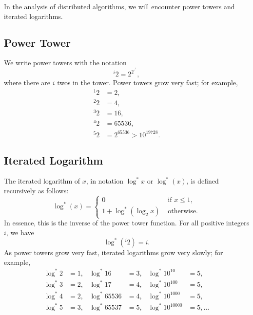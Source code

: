 \label{sec:intro-app}

In the analysis of distributed algorithms, we will encounter power towers and iterated logarithms.

\subsection{Power Tower}

We write power towers with the notation
\[
    {}^i 2 = 2^{2^{\cdot^{\cdot^2}}},
\]
where there are $i$ twos in the tower. Power towers grow very fast; for example,
\begin{align*}
    {}^1 2 &= 2,\\
    {}^2 2 &= 4,\\
    {}^3 2 &= 16,\\
    {}^4 2 &= 65536,\\
    {}^5 2 &= 2^{65536} > 10^{19728}.
\end{align*}

\subsection{Iterated Logarithm}

The iterated logarithm of $x$, in notation $\log^* x$ or $\log^*(x)$, is defined recursively as follows:
\[
    \log^*(x) = \begin{cases}
        0 & \text{ if $x \le 1$}, \\
        1 + \log^*(\log_2 x) & \text{ otherwise}.
    \end{cases}
\]
In essence, this is the inverse of the power tower function. For all positive integers $i$, we have
\[
    \log^*({}^i 2) = i.
\]
As power towers grow very fast, iterated logarithms grow very slowly; for example,
\begin{align*}
    \log^* 2 &= 1, &
    \log^* 16 &= 3, &
    \log^* 10^{10} &= 5, \\
    \log^* 3 &= 2, &
    \log^* 17 &= 4, &
    \log^* 10^{100} &= 5, \\
    \log^* 4 &= 2, &
    \log^* 65536 &= 4, &
    \log^* 10^{1000} &= 5, \\
    \log^* 5 &= 3, &
    \log^* 65537 &= 5, &
    \log^* 10^{10000} &= 5, \dotsc
\end{align*}

